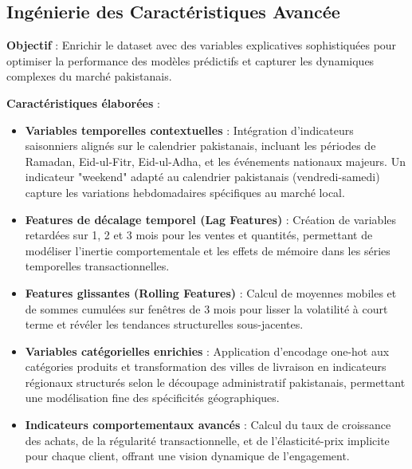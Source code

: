 \documentclass[a4paper,12pt]{article}
\begin{document}
\subsection{Ingénierie des Caractéristiques Avancée}

\textbf{Objectif} : Enrichir le dataset avec des variables explicatives sophistiquées pour optimiser la performance des modèles prédictifs et capturer les dynamiques complexes du marché pakistanais.

\textbf{Caractéristiques élaborées} :
\begin{itemize}
    \item \textbf{Variables temporelles contextuelles} : Intégration d'indicateurs saisonniers alignés sur le calendrier pakistanais, incluant les périodes de Ramadan, Eid-ul-Fitr, Eid-ul-Adha, et les événements nationaux majeurs. Un indicateur "weekend" adapté au calendrier pakistanais (vendredi-samedi) capture les variations hebdomadaires spécifiques au marché local.
    
    \item \textbf{Features de décalage temporel (Lag Features)} : Création de variables retardées sur 1, 2 et 3 mois pour les ventes et quantités, permettant de modéliser l'inertie comportementale et les effets de mémoire dans les séries temporelles transactionnelles.
    
    \item \textbf{Features glissantes (Rolling Features)} : Calcul de moyennes mobiles et de sommes cumulées sur fenêtres de 3 mois pour lisser la volatilité à court terme et révéler les tendances structurelles sous-jacentes.
    
    \item \textbf{Variables catégorielles enrichies} : Application d'encodage one-hot aux catégories produits et transformation des villes de livraison en indicateurs régionaux structurés selon le découpage administratif pakistanais, permettant une modélisation fine des spécificités géographiques.
    
    \item \textbf{Indicateurs comportementaux avancés} : Calcul du taux de croissance des achats, de la régularité transactionnelle, et de l'élasticité-prix implicite pour chaque client, offrant une vision dynamique de l'engagement.
\end{itemize}

\end{document}
